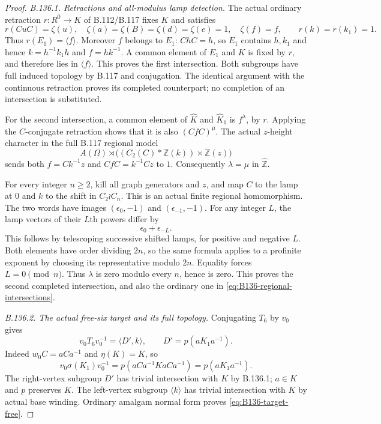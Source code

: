 \begin{proof}
\emph{B.136.1. Retractions and all-modulus lamp detection.}
The actual ordinary retraction $r:R^0\to K$ of B.112/B.117 fixes
$K$ and satisfies
\[
 r(CuC)=\zeta(u),\quad
 \zeta(a)=\zeta(B)=\zeta(d)=\zeta(e)=1,\quad\zeta(f)=f,
 \qquad r(k)=r(k_1)=1.
\]
Thus $r(E_1)=\langle f\rangle$. Moreover $f$ belongs to $E_1$:
$ChC=h$, so $E_1$ contains $h,k_1$ and hence
$k=h^{-1}k_1h$ and $f=hk^{-1}$. A common element of $E_1$ and
$K$ is fixed by $r$, and therefore lies in $\langle f\rangle$.
This proves the first intersection. Both subgroups have full
induced topology by B.117 and conjugation. The identical argument
with the continuous retraction proves its completed counterpart;
no completion of an intersection is substituted.

For the second intersection, a common element of $\widehat K$
and $\widehat K_1$ is $f^{\lambda}$, by $r$. Applying the
$C$-conjugate retraction shows that it is also $(CfC)^{\mu}$.
The actual $z$-height character in the full B.117 regional model
\[
 A(\Omega)\rtimes
       \bigl((C_2(C)*\mathbb Z(k))\times\mathbb Z(z)\bigr)
\]
sends both $f=Ck^{-1}z$ and $CfC=k^{-1}Cz$ to $1$.
Consequently $\lambda=\mu$ in $\widehat{\mathbb Z}$.

For every integer $n\geq2$, kill all graph generators and $z$,
and map $C$ to the lamp at $0$ and $k$ to the shift in
$C_2\wr C_n$. This is an actual finite regional homomorphism.
The two words have images $(\epsilon_0,-1)$ and
$(\epsilon_{-1},-1)$. For any integer $L$, the lamp vectors of
their $L$th powers differ by
\[
 \epsilon_0+\epsilon_{-L}.
\]
This follows by telescoping successive shifted lamps, for positive
and negative $L$. Both elements have order dividing $2n$, so the
same formula applies to a profinite exponent by choosing its
representative modulo $2n$. Equality forces $L=0\pmod n$.
Thus $\lambda$ is zero modulo every $n$, hence is zero. This
proves the second completed intersection, and also the ordinary
one in \eqref{eq:B136-regional-intersections}.

\emph{B.136.2. The actual free-six target and its full topology.}
Conjugating $T_6$ by $v_0$ gives
\begin{equation}\label{eq:B136-target-conjugation}
 v_0T_6v_0^{-1}=\langle D',k\rangle,
 \qquad D'=p(aK_1a^{-1}).
\end{equation}
Indeed $w_0C=aCa^{-1}$ and $\eta(K)=K$, so
\[
 v_0\sigma(K_1)v_0^{-1}
     =p(aCa^{-1}KaCa^{-1})=p(aK_1a^{-1}).
\]
The right-vertex subgroup $D'$ has trivial intersection with $K$
by B.136.1; $a\in K$ and $p$ preserves $K$. The left-vertex
subgroup $\langle k\rangle$ has trivial intersection with $K$
by actual base winding. Ordinary amalgam normal form proves
\eqref{eq:B136-target-free}.


\end{proof}
